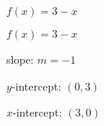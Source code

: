 {$f(x) = 3-x$}
{$f(x) =3-x$

slope: $m = -1$ 

$y$-intercept:  $(0,3)$

$x$-intercept: $(3, 0)$ 
\begin{center}
\end{center}}